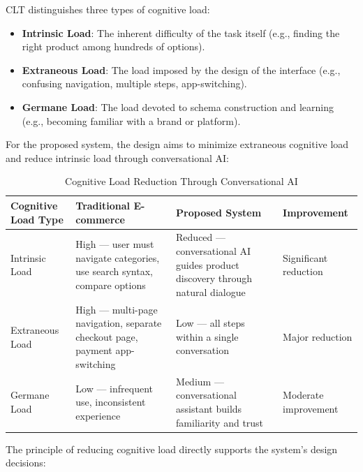 \documentclass[12pt,a4paper]{article}
\begin{document}
CLT distinguishes three types of cognitive load:

\begin{itemize}
    \item \textbf{Intrinsic Load}: The inherent difficulty of the task itself (e.g., finding the right product among hundreds of options).
    \item \textbf{Extraneous Load}: The load imposed by the design of the interface (e.g., confusing navigation, multiple steps, app-switching).
    \item \textbf{Germane Load}: The load devoted to schema construction and learning (e.g., becoming familiar with a brand or platform).
\end{itemize}

For the proposed system, the design aims to minimize extraneous cognitive load and reduce intrinsic load through conversational AI:

\begin{table}[h]
\centering
\caption{Cognitive Load Reduction Through Conversational AI}
\label{tab:clt}
\begin{tabular}{p{4cm}p{5cm}p{5cm}p{3cm}}
\toprule
\textbf{Cognitive Load Type} & \textbf{Traditional E-commerce} & \textbf{Proposed System} & \textbf{Improvement} \\
\midrule
Intrinsic Load & High --- user must navigate categories, use search syntax, compare options & Reduced --- conversational AI guides product discovery through natural dialogue & Significant reduction \\
Extraneous Load & High --- multi-page navigation, separate checkout page, payment app-switching & Low --- all steps within a single conversation & Major reduction \\
Germane Load & Low --- infrequent use, inconsistent experience & Medium --- conversational assistant builds familiarity and trust & Moderate improvement \\
\bottomrule
\end{tabular}
\end{table}

The principle of reducing cognitive load directly supports the system's design decisions:
\end{document}

